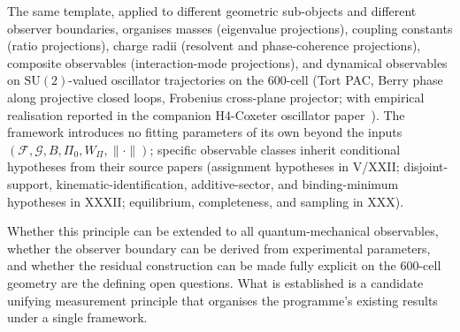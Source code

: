 \documentclass[12pt]{article}
\newcommand{\Fcal}{\mathcal{F}}
\newcommand{\Gcal}{\mathcal{G}}
\begin{document}
The same template, applied to different geometric sub-objects and different observer boundaries, organises masses (eigenvalue projections), coupling constants (ratio projections), charge radii (resolvent and phase-coherence projections), composite observables (interaction-mode projections), and dynamical observables on $\mathrm{SU}(2)$-valued oscillator trajectories on the 600-cell (Tort PAC, Berry phase along projective closed loops, Frobenius cross-plane projector; with empirical realisation reported in the companion H4-Coxeter oscillator paper~\citep{H4Coxeter2026}). The framework introduces no fitting parameters of its own beyond the inputs $(\Fcal, \Gcal, B, \Pi_0, W_\Pi, \|\cdot\|)$; specific observable classes inherit conditional hypotheses from their source papers (assignment hypotheses in V/XXII; disjoint-support, kinematic-identification, additive-sector, and binding-minimum hypotheses in XXXII; equilibrium, completeness, and sampling in XXX).

Whether this principle can be extended to all quantum-mechanical observables, whether the observer boundary can be derived from experimental parameters, and whether the residual construction can be made fully explicit on the 600-cell geometry are the defining open questions. What is established is a candidate unifying measurement principle that organises the programme's existing results under a single framework.



\end{document}
